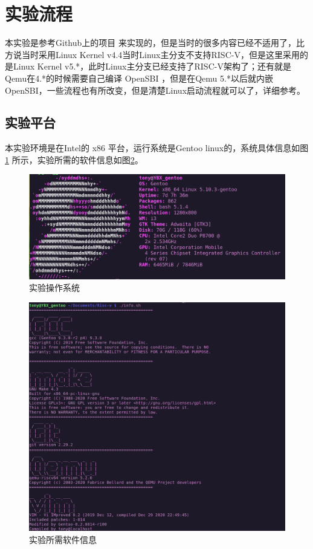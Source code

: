 \section{实验流程}
本实验是参考Github上的项目 \cite{BusyBear} 来实现的，但是当时的很多内容已经不适用了，比方说当时采用Linux Kernel v4.4当时Linux主分支不支持RISC-V，但是这里采用的是Linux Kernel v5.*，此时Linux主分支已经支持了RISC-V架构了；还有就是Qemu在4.*的时候需要自己编译 OpenSBI ，但是在Qemu 5.*以后就内嵌 OpenSBI，一些流程也有所改变，但是清楚Linux启动流程就可以了，详细参考\cite{从按下电源开始的一场接力赛}。

\subsection{实验平台}
本实验环境是在Intel的 x86 平台，运行系统是Gentoo linux的，系统具体信息如图\ref{fig:gentoo} 所示，实验所需的软件信息如图\ref{fig:info}。

\begin{figure}[htbp]
  \centering %
  \includegraphics[width=0.8 \textwidth]{figs/Process/gentoo_Logo.eps}
  \caption{实验操作系统}
  \label{fig:gentoo} %
\end{figure}

\begin{figure}[htbp]
  \centering %
  \includegraphics[width=1.0 \textwidth]{figs/Process/info.png}
  \caption{实验所需软件信息}
  \label{fig:info} %
\end{figure}

